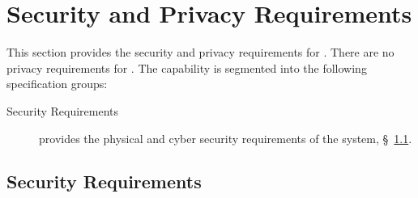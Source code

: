 \KNEADSECTIONNEWPAGE
\section{Security and Privacy Requirements}
\label{lab:sec_SecurityPrivacy}
% 

This section provides the security and privacy requirements for \ThisSys. There are no privacy requirements for \ThisSys.
The \ThisSys capability is segmented into the following specification groups:

\begin{description}
	\item [Security Requirements] provides the physical and cyber security requirements of the system, \S~\ref{lab:ssec_Security}.
\end{description}

\KNEADSUBSECTIONNEWPAGE
\subsection{Security Requirements}
\label{lab:ssec_Security}






% 